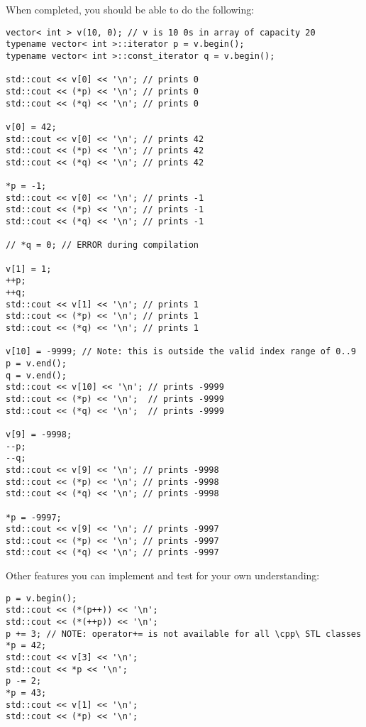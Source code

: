 When completed, you should be able to do the following:
\begin{Verbatim}[fontsize=\footnotesize, frame=single]
vector< int > v(10, 0); // v is 10 0s in array of capacity 20
typename vector< int >::iterator p = v.begin();
typename vector< int >::const_iterator q = v.begin();

std::cout << v[0] << '\n'; // prints 0
std::cout << (*p) << '\n'; // prints 0
std::cout << (*q) << '\n'; // prints 0

v[0] = 42;
std::cout << v[0] << '\n'; // prints 42
std::cout << (*p) << '\n'; // prints 42
std::cout << (*q) << '\n'; // prints 42

*p = -1;
std::cout << v[0] << '\n'; // prints -1
std::cout << (*p) << '\n'; // prints -1
std::cout << (*q) << '\n'; // prints -1

// *q = 0; // ERROR during compilation

v[1] = 1;
++p;
++q;
std::cout << v[1] << '\n'; // prints 1
std::cout << (*p) << '\n'; // prints 1
std::cout << (*q) << '\n'; // prints 1

v[10] = -9999; // Note: this is outside the valid index range of 0..9
p = v.end();
q = v.end();
std::cout << v[10] << '\n'; // prints -9999
std::cout << (*p) << '\n';  // prints -9999
std::cout << (*q) << '\n';  // prints -9999

v[9] = -9998;
--p;
--q;
std::cout << v[9] << '\n'; // prints -9998
std::cout << (*p) << '\n'; // prints -9998
std::cout << (*q) << '\n'; // prints -9998

*p = -9997;
std::cout << v[9] << '\n'; // prints -9997
std::cout << (*p) << '\n'; // prints -9997
std::cout << (*q) << '\n'; // prints -9997
\end{Verbatim}
Other features you can implement and test for your own understanding:
\begin{Verbatim}[fontsize=\footnotesize, frame=single]
p = v.begin();
std::cout << (*(p++)) << '\n';
std::cout << (*(++p)) << '\n';
p += 3; // NOTE: operator+= is not available for all \cpp\ STL classes
*p = 42;
std::cout << v[3] << '\n';
std::cout << *p << '\n';
p -= 2;
*p = 43;
std::cout << v[1] << '\n';
std::cout << (*p) << '\n';
\end{Verbatim}

